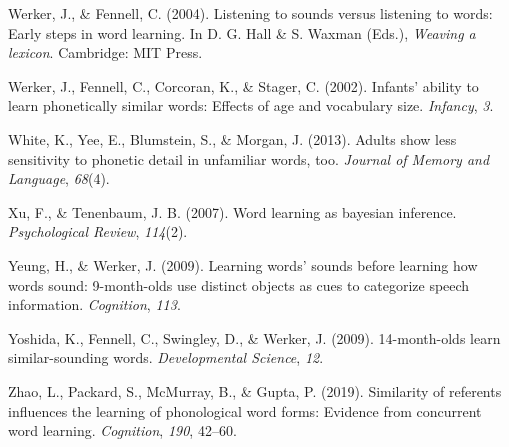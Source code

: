 \documentclass[english,,man]{apa6}
\begin{document}
\leavevmode\hypertarget{ref-werker2004}{}%
Werker, J., \& Fennell, C. (2004). Listening to sounds versus listening to words: Early steps in word learning. In D. G. Hall \& S. Waxman (Eds.), \emph{Weaving a lexicon}. Cambridge: MIT Press.

\leavevmode\hypertarget{ref-werker2002}{}%
Werker, J., Fennell, C., Corcoran, K., \& Stager, C. (2002). Infants' ability to learn phonetically similar words: Effects of age and vocabulary size. \emph{Infancy}, \emph{3}.

\leavevmode\hypertarget{ref-white2013}{}%
White, K., Yee, E., Blumstein, S., \& Morgan, J. (2013). Adults show less sensitivity to phonetic detail in unfamiliar words, too. \emph{Journal of Memory and Language}, \emph{68}(4).

\leavevmode\hypertarget{ref-xu2007}{}%
Xu, F., \& Tenenbaum, J. B. (2007). Word learning as bayesian inference. \emph{Psychological Review}, \emph{114}(2).

\leavevmode\hypertarget{ref-yeung09}{}%
Yeung, H., \& Werker, J. (2009). Learning words' sounds before learning how words sound: 9-month-olds use distinct objects as cues to categorize speech information. \emph{Cognition}, \emph{113}.

\leavevmode\hypertarget{ref-yoshida2009}{}%
Yoshida, K., Fennell, C., Swingley, D., \& Werker, J. (2009). 14-month-olds learn similar-sounding words. \emph{Developmental Science}, \emph{12}.

\leavevmode\hypertarget{ref-Zhao2019}{}%
Zhao, L., Packard, S., McMurray, B., \& Gupta, P. (2019). Similarity of referents influences the learning of phonological word forms: Evidence from concurrent word learning. \emph{Cognition}, \emph{190}, 42--60.

\clearpage
\renewcommand{\listfigurename}{Figure captions}
\end{document}
